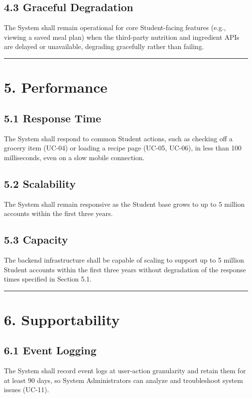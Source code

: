 \documentclass[10pt,letterpaper]{article}
\newcommand{\ucseparator}{\vspace{1em}\noindent\rule{\linewidth}{0.4pt}\vspace{1.5em}}
\begin{document}
\subsection*{4.3 Graceful Degradation}
The System shall remain operational for core Student-facing features (e.g., viewing a saved meal plan) when the third-party nutrition and ingredient APIs are delayed or unavailable, degrading gracefully rather than failing.

\ucseparator

\section*{5. Performance}

\subsection*{5.1 Response Time}
The System shall respond to common Student actions, such as checking off a grocery item (UC-04) or loading a recipe page (UC-05, UC-06), in less than 100 milliseconds, even on a slow mobile connection.

\subsection*{5.2 Scalability}
The System shall remain responsive as the Student base grows to up to 5 million accounts within the first three years.

\subsection*{5.3 Capacity}
The backend infrastructure shall be capable of scaling to support up to 5 million Student accounts within the first three years without degradation of the response times specified in Section 5.1.

\ucseparator

\section*{6. Supportability}

\subsection*{6.1 Event Logging}
The System shall record event logs at user-action granularity and retain them for at least 90 days, so System Administrators can analyze and troubleshoot system issues (UC-11).
\end{document}
